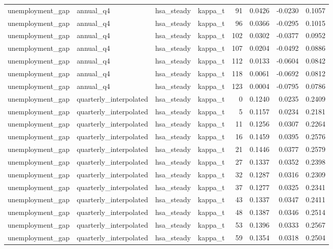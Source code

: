 \begin{tabular}{llllrrrr}
unemployment\_gap & annual\_q4 & hsa\_steady & kappa\_t & 91 & 0.0426 & -0.0230 & 0.1057 \\
unemployment\_gap & annual\_q4 & hsa\_steady & kappa\_t & 96 & 0.0366 & -0.0295 & 0.1015 \\
unemployment\_gap & annual\_q4 & hsa\_steady & kappa\_t & 102 & 0.0302 & -0.0377 & 0.0952 \\
unemployment\_gap & annual\_q4 & hsa\_steady & kappa\_t & 107 & 0.0204 & -0.0492 & 0.0886 \\
unemployment\_gap & annual\_q4 & hsa\_steady & kappa\_t & 112 & 0.0133 & -0.0604 & 0.0842 \\
unemployment\_gap & annual\_q4 & hsa\_steady & kappa\_t & 118 & 0.0061 & -0.0692 & 0.0812 \\
unemployment\_gap & annual\_q4 & hsa\_steady & kappa\_t & 123 & 0.0004 & -0.0795 & 0.0786 \\
unemployment\_gap & quarterly\_interpolated & hsa\_steady & kappa\_t & 0 & 0.1240 & 0.0235 & 0.2409 \\
unemployment\_gap & quarterly\_interpolated & hsa\_steady & kappa\_t & 5 & 0.1157 & 0.0234 & 0.2181 \\
unemployment\_gap & quarterly\_interpolated & hsa\_steady & kappa\_t & 11 & 0.1256 & 0.0307 & 0.2264 \\
unemployment\_gap & quarterly\_interpolated & hsa\_steady & kappa\_t & 16 & 0.1459 & 0.0395 & 0.2576 \\
unemployment\_gap & quarterly\_interpolated & hsa\_steady & kappa\_t & 21 & 0.1446 & 0.0377 & 0.2579 \\
unemployment\_gap & quarterly\_interpolated & hsa\_steady & kappa\_t & 27 & 0.1337 & 0.0352 & 0.2398 \\
unemployment\_gap & quarterly\_interpolated & hsa\_steady & kappa\_t & 32 & 0.1287 & 0.0316 & 0.2309 \\
unemployment\_gap & quarterly\_interpolated & hsa\_steady & kappa\_t & 37 & 0.1277 & 0.0325 & 0.2341 \\
unemployment\_gap & quarterly\_interpolated & hsa\_steady & kappa\_t & 43 & 0.1337 & 0.0347 & 0.2411 \\
unemployment\_gap & quarterly\_interpolated & hsa\_steady & kappa\_t & 48 & 0.1387 & 0.0346 & 0.2514 \\
unemployment\_gap & quarterly\_interpolated & hsa\_steady & kappa\_t & 53 & 0.1396 & 0.0333 & 0.2567 \\
unemployment\_gap & quarterly\_interpolated & hsa\_steady & kappa\_t & 59 & 0.1354 & 0.0318 & 0.2504 \\

\end{tabular}
